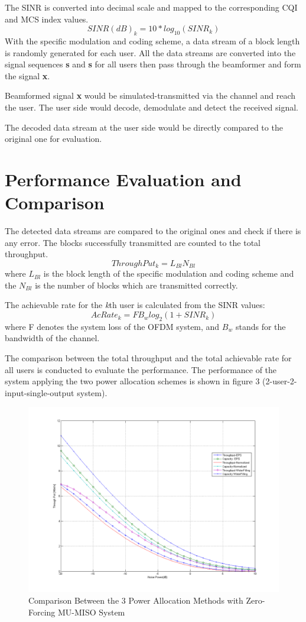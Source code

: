 \documentclass{article}
\begin{document}
\noindent
The SINR is converted into decimal scale and mapped to the corresponding CQI and MCS index values.
$$SINR(dB)_k = 10*log_{10}(SINR_k)$$
With the specific modulation and coding scheme, a data stream of a block length is randomly generated for each user.
All the data streams are converted into the signal sequences \textbf{s}
and \textbf{s} for all users then pass through the beamformer and form the signal \textbf{x}.

\noindent
Beamformed signal \textbf{x} would be simulated-transmitted via the channel and reach the user.
The user side would decode, demodulate and detect the received signal.

\noindent
The decoded data stream at the user side would be directly compared to the original one for evaluation.


\section{Performance Evaluation and Comparison}
The detected data streams are compared to the original ones and check if there is any error. The blocks successfully transmitted are counted to the total throughput.
\[ThroughPut_k = L_{Bl}N_{Bl}\]
where $L_{Bl}$ is the block length of the specific modulation and coding scheme and the $N_{Bl}$ is the number of blocks which are transmitted correctly.

\noindent
The achievable rate for the \textit{k}th user is calculated from the SINR values:
$$AcRate_k = FB_wlog_2(1+SINR_k)$$
where F denotes the system loss of the OFDM system, and $B_w$ stands for the bandwidth of the channel.

\noindent
The comparison between the total throughput and the total achievable rate for all users is conducted to evaluate the performance.
The performance of the system applying the two power allocation schemes is shown in figure 3 (2-user-2-input-single-output system).


\begin{figure}[ht]
\centering
\includegraphics[scale=0.45]{Comparison.png}
\caption{Comparison Between the 3 Power Allocation Methods with Zero-Forcing MU-MISO System}
\label{fig:Comparison}
\end{figure}
\end{document}
